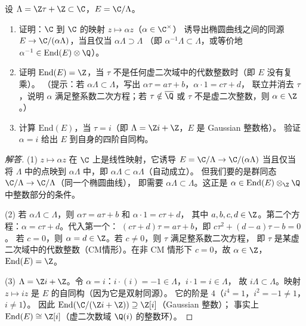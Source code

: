 \begin{exercise}
\label{ex:ch1-isogeny-and-endo}
设 $\Lambda = \Z\tau + \Z \subset \C$，$E = \C/\Lambda$。
\begin{enumerate}
  \item[(1)] 证明：$\C$ 到 $\C$ 的映射 $z \mapsto \alpha z$（$\alpha \in \C^\times$）
    诱导出椭圆曲线之间的同源 $E \to \C/(\alpha\Lambda)$，当且仅当 $\alpha\Lambda \supset \Lambda$
    （即 $\alpha^{-1}\Lambda \subset \Lambda$，或等价地 $\alpha^{-1} \in \mathrm{End}(E) \otimes \Q$）。
  \item[(2)] 证明 $\mathrm{End}(E) = \Z$，当 $\tau$ 不是任何虚二次域中的代数整数时（即 $E$ 没有复乘）。
    （提示：若 $\alpha\Lambda \subset \Lambda$，写出 $\alpha\tau = a\tau+b$，$\alpha \cdot 1 = c\tau+d$，
    联立并消去 $\tau$，说明 $\alpha$ 满足整系数二次方程；若 $\tau \notin \overline{\Q}$ 或 $\tau$ 不是虚二次整数，则 $\alpha \in \Z$。）
  \item[(3)] 计算 $\mathrm{End}(E)$，当 $\tau = i$（即 $\Lambda = \Z i + \Z$，$E$ 是 Gaussian 整数格）。
    验证 $\alpha = i$ 给出 $E$ 到自身的四阶自同构。
\end{enumerate}
\end{exercise}

\begin{proof}[解答]
(1) $z \mapsto \alpha z$ 在 $\C$ 上是线性映射，它诱导 $E = \C/\Lambda \to \C/(\alpha\Lambda)$ 当且仅当
将 $\Lambda$ 中的点映到 $\alpha\Lambda$ 中，即 $\alpha\Lambda \subset \alpha\Lambda$（自动成立）。
但我们要的是群同态 $\C/\Lambda \to \C/\Lambda$（同一个椭圆曲线），
即需要 $\alpha\Lambda \subset \Lambda$。这正是 $\alpha \in \mathrm{End}(E) \otimes_\Z \Q$ 中整数部分的条件。

(2) 若 $\alpha\Lambda \subset \Lambda$，则 $\alpha\tau = a\tau + b$ 和 $\alpha \cdot 1 = c\tau + d$，
其中 $a,b,c,d \in \Z$。第二个方程：$\alpha = c\tau + d$。代入第一个：
$(c\tau+d)\tau = a\tau + b$，即 $c\tau^2 + (d-a)\tau - b = 0$。
若 $c = 0$，则 $\alpha = d \in \Z$。若 $c \neq 0$，则 $\tau$ 满足整系数二次方程，
即 $\tau$ 是某虚二次域中的代数整数（CM情形）。在非 CM 情形下 $c = 0$，故 $\alpha \in \Z$，$\mathrm{End}(E) = \Z$。

(3) $\Lambda = \Z i + \Z$。令 $\alpha = i$：$i \cdot (i) = -1 \in \Lambda$，$i \cdot 1 = i \in \Lambda$，
故 $i\Lambda \subset \Lambda$。映射 $z \mapsto iz$ 是 $E$ 的自同构（因为它是双射同源）。
它的阶是 $4$（$i^4 = 1$，$i^2 = -1 \neq 1$，$i \neq 1$）。
因此 $\mathrm{End}(\C/(\Z i+\Z)) \supseteq \Z[i]$（Gaussian 整数）；
事实上 $\mathrm{End}(E) \cong \Z[i]$（虚二次数域 $\Q(i)$ 的整数环）。\qedhere
\end{proof}
